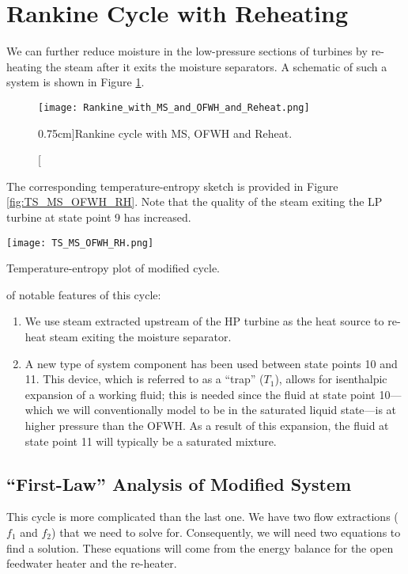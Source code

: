 \section{Rankine Cycle with Reheating} 
We can further reduce moisture in the low-pressure sections of turbines by re-heating the steam after it exits the moisture separators.  A schematic of such a system is shown in Figure \ref{fig:RS_MS_OFWH_RH}.  
\begin{figure}
\texttt{[image: Rankine\_with\_MS\_and\_OFWH\_and\_Reheat.png]}
\caption[][0.75cm]{Rankine cycle with MS, OFWH and Reheat.}
\label{fig:RS_MS_OFWH_RH}
\end{figure}
 

The corresponding temperature-entropy sketch is provided in Figure \ref{fig:TS_MS_OFWH_RH}.  Note that the quality of the steam exiting the LP turbine at state point 9 has increased.
\begin{marginfigure}
\texttt{[image: TS\_MS\_OFWH\_RH.png]}
\caption{Temperature-entropy plot of modified cycle.}
\label{fig:TS_MS_OFWH_RH}
\end{marginfigure}
 of notable features of this cycle:
\begin{enumerate}
\item We use steam extracted upstream of the HP turbine as the heat source to re-heat steam exiting the moisture separator. 
\item A new type of system component has been used between state points 10 and 11.  This device, which is referred to as a ``trap'' ($T_1$), allows for isenthalpic expansion of a working fluid; this is needed since the fluid at state point 10---which we will conventionally model to be in the saturated liquid state---is at higher pressure than the OFWH.  As a result of this expansion, the fluid at state point 11 will typically be a saturated mixture.
\end{enumerate}

\subsection{``First-Law'' Analysis of Modified System}
This cycle is more complicated than the last one.  We have two flow extractions ($f_1$ and $f_2$) that we need to solve for.  Consequently, we will need two equations to find a solution.  These equations will come from the energy balance for the open feedwater heater and the re-heater.  

